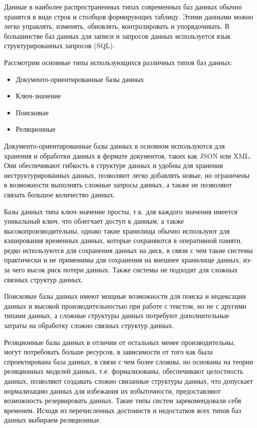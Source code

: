 Данные в наиболее распространенных типах современных баз данных обычно хранятся в виде строк и столбцов формирующих таблицу. Этими данными можно легко управлять, изменять, обновлять, контролировать и упорядочивать. В большинстве баз данных для записи и запросов данных используется язык структурированных запросов (SQL). \cite{web:oracledef}

Рассмотрим основные типы использующихся различных типов баз данных:

\begin{itemize}
    \item
        Документо-ориентированные базы данных
    \item
        Ключ-значение
    \item
        Поисковые 
    \item 
        Реляционные
\end{itemize}

Документо-ориентированные базы данных в основном используются для хранения и обработки данных в формате документов, таких как JSON или XML. Они обеспечивают гибкость в структуре данных и удобны для хранения неструктурированных данных, позволяют легко добавлять новые, но ограничены в возможности выполнять сложные запросы данных, а также не позволяют связать большое количество данных.

Базы данных типа ключ-значение просты, т.к. для каждого значения имеется уникальный ключ, что облегчает доступ к данным, а также высокопроизводительны, однако такие хранилища обычно используют для кэширования временных данных, которые сохраняются в оперативной памяти, редко используются для сохранения данных на диск, в связи с чем такие системы практически и не применимы для сохранения на внешнее хранилище данных, из-за чего высок риск потери данных. Также системы не подходят для сложных связных структур данных.

Поисковые базы данных имеют мощные возможности для поиска и индексации данных и высокой производительностью при работе с текстом, но не с другими типами данных, а сложные структуры данных потребуют дополнительные затраты на обработку сложно связных структур данных.

Реляционные базы данных в отличии от остальных менее производительны, могут потребовать больше ресурсов, в зависимости от того как была спроектирована база данных, в связи с чем более сложны, но основаны на теории реляционных моделей данных, т.е. формализованы, обеспечивают целостность данных, позволяют создавать сложно связанные структуры данных, что допускает нормализацию данных для избежания их избыточности, предоставляют возможность резервировать данных. Такие типы систем зарекомендовали себя временем. Исходя из перечисленных достоинств и недостатков всех типов баз данных выбираем реляционные.

